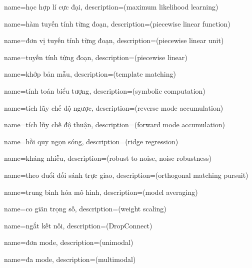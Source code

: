 
{
    name={học hợp lí cực đại},
    description={(maximum likelihood learning)}
}

{
    name={hàm tuyến tính từng đoạn},
    description={(piecewise linear function)}
}

{
    name={đơn vị tuyến tính từng đoạn},
    description={(piecewise linear unit)}
}

{
    name={tuyến tính từng đoạn},
    description={(piecewise linear)}
}

{
    name={khớp bản mẫu},
    description={(template matching)}
}

{
    name={tính toán biểu tượng},
    description={(symbolic computation)}
}

{
    name={tích lũy chế độ ngược},
    description={(reverse mode accumulation)}
}

{
    name={tích lũy chế độ thuận},
    description={(forward mode accumulation)}
}

{
    name={hồi quy ngọn sóng},
    description={(ridge regression)}
}

{
    name={kháng nhiễu},
    description={(robust to noise, noise robustness)}
}

{
    name={theo đuổi đối sánh trực giao},
    description={(orthogonal matching pursuit)}
}


{
    name={trung bình hóa mô hình},
    description={(model averaging)}
}

{
    name={co giãn trọng số},
    description={(weight scaling)}
}

{
    name={ngắt kết nối},
    description={(DropConnect)}
}

{
    name={đơn mode},
    description={(unimodal)}
}

{
    name={đa mode},
    description={(multimodal)}
}

